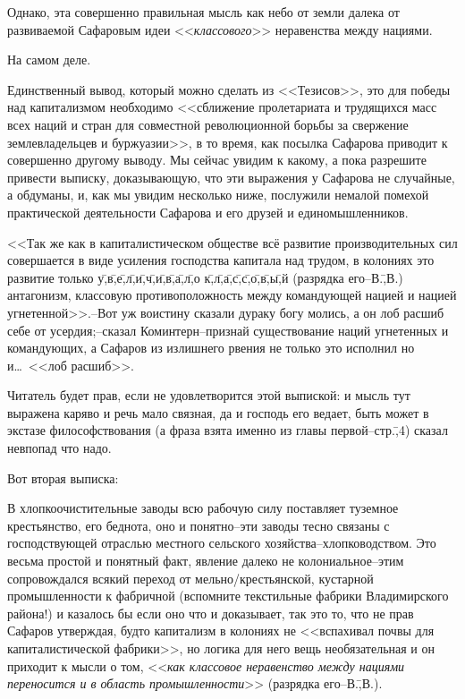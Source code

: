 Однако, эта совершенно правильная мысль как небо от земли далека от развиваемой Сафаровым идеи <<\emph{классового}>> неравенства между нациями.

На самом деле.

Единственный вывод, который можно сделать из <<Тезисов>>, это для победы над капитализмом необходимо <<сближение пролетариата и трудящихся масс всех наций и стран для совместной революционной борьбы за свержение землевладельцев и буржуазии>>, в то время, как посылка Сафарова приводит к совершенно другому выводу. Мы сейчас увидим к какому, а пока разрешите привести выписку, доказывающую, что эти выражения у Сафарова не случайные, а обдуманы, и, как мы увидим несколько ниже, послужили немалой помехой практической деятельности Сафарова и его друзей и единомышленников.

<<Так же как в капиталистическом обществе всё развитие производительных сил совершается в виде усиления господства капитала над трудом, в колониях это развитие только у\=,в\=,е\=,л\=,и\=,ч\=,и\=,в\=,а\=,л\=,о к\=,л\=,а\=,с\=,с\=,о\=,в\=,ы\=,й (разрядка его\---В.\=,В.) антагонизм, классовую противоположность между командующей нацией и нацией угнетенной>>.\---Вот уж воистину сказали дураку богу молись, а он лоб расшиб себе от усердия;\---сказал Коминтерн\---признай существование наций угнетенных и командующих, а Сафаров из излишнего рвения не только это исполнил но и\dots\ <<лоб расшиб>>.

Читатель будет прав, если не удовлетворится этой выпиской: и мысль тут выражена каряво и речь мало связная, да и господь его ведает, быть может в экстазе философствования (а фраза взята именно из главы первой\---стр.\=,4) сказал невпопад что надо.

Вот вторая выписка:

В хлопкоочистительные заводы всю рабочую силу поставляет туземное крестьянство, его беднота, оно и понятно\---эти заводы тесно связаны с господствующей отраслью местного сельского хозяйства\---хлопководством. Это весьма простой и понятный факт, явление далеко не колониальное\---этим сопровождался всякий переход от мельно\-/крестьянской, кустарной промышленности к фабричной (вспомните текстильные фабрики Владимирского района!) и казалось бы если оно что и доказывает, так это то, что не прав Сафаров утверждая, будто капитализм в колониях не <<вспахивал почвы для капиталистической фабрики>>, но логика для него вещь необязательная и он приходит к мысли о том, <<\emph{как классовое неравенство между нациями переносится и в область промышленности}>> (разрядка его\---В.\=,В.).

